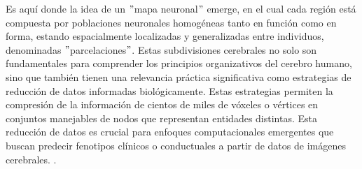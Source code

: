 \documentclass[11pt,letterpaper]{article}
\numberwithin{equation}{subsection}
\numberwithin{table}{subsection}
\begin{document}
\bigskip
\noindent Es aquí donde la idea de un $"$mapa neuronal$"$ emerge, en el cual cada región está compuesta por poblaciones neuronales homogéneas tanto en función como en forma, estando espacialmente localizadas y generalizadas entre individuos, denominadas $"$parcelaciones$"$. Estas subdivisiones cerebrales no solo son fundamentales para comprender los principios organizativos del cerebro humano, sino que también tienen una relevancia práctica significativa como estrategias de reducción de datos informadas biológicamente. Estas estrategias permiten la compresión de la información de cientos de miles de vóxeles o vértices en conjuntos manejables de nodos que representan entidades distintas. Esta reducción de datos es crucial para enfoques computacionales emergentes que buscan predecir fenotipos clínicos o conductuales a partir de datos de imágenes cerebrales. \cite{finn2015functional, davatzikos2016computational, miller2016multimodal}.
\end{document}

